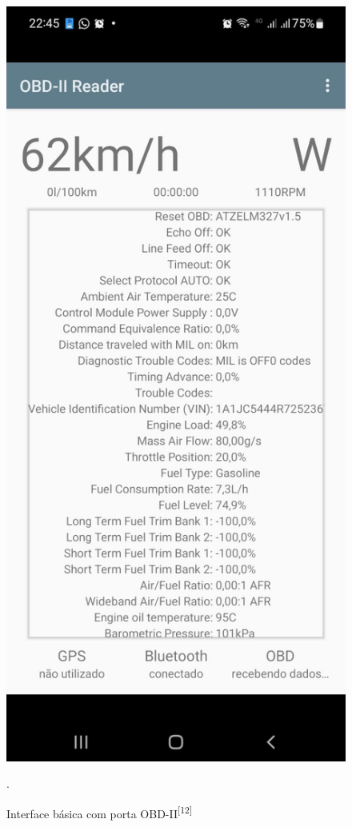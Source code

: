     \begin{figure}[hp]
    \centering
    
    \includegraphics[scale=0.3]{figures/obd2.jpg}
    
    \caption{Interface básica com porta OBD-II\textsuperscript{[12]}}.
    
    \label{fig:obd2_plataforma}
\end{figure}
    
